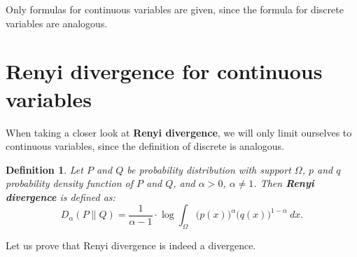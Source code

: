 \documentclass[a4paper, 12pt]{article}
\newtheorem{definition}{Definition}[section]
\theoremstyle{definition}
\begin{document}
Only formulas for continuous variables are given, since the formula for discrete variables are analogous.

\section{Renyi divergence for continuous variables}

When taking a closer look at \textbf{Renyi divergence}, we will only limit ourselves to continuous variables, since the definition of discrete is analogous.


\begin{definition}
	Let $P$ and $Q$  be probability distribution with support $\Omega$, $p$ and $q$ probability density function of $P$ and $Q$, and $\alpha > 0$, $\alpha \neq 1$. Then \textbf{Renyi divergence} is defined as:
	\begin{equation}\label{Renyi-divergence}
		D_{\alpha}(P \| Q)=\frac{1}{\alpha-1} \cdot \log \int_{\Omega} \Big(p(x)\Big)^{\alpha}\Big(q(x)\Big)^{1-\alpha}\  dx.
	\end{equation}
\end{definition}

Let us prove that Renyi divergence is indeed a divergence.
\end{document}
